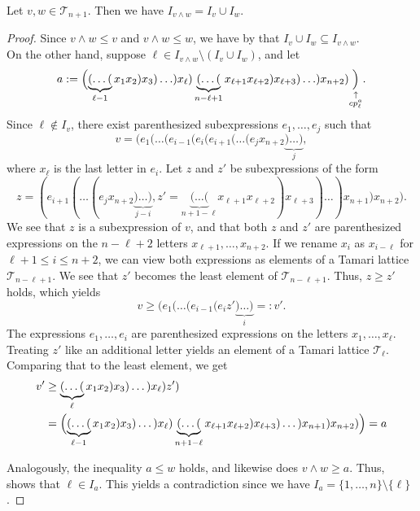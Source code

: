 \documentclass{preprint}
\newcommand{\cT}{\mathcal{T}}
\theoremstyle{definition}
\begin{document}
\begin{lemma}\label{lem: meet height is union}
    Let $v,w \in \cT_{n+1}$. Then we have $I_{v \wedge w} = I_v \cup I_w$.
\end{lemma}
\begin{proof}
    Since $v\wedge w \leq v$ and $v\wedge w \leq w$, we have by  that $I_v \cup I_w \subseteq I_{v\wedge w}$. \\
    On the other hand, suppose $\ell \in I_{v \wedge w}\setminus(I_v \cup I_w)$, and let 
    $$a:= \Bigl(\underbrace{(\dots(}_{\ell-1}x_1x_2)x_3)\ldots)x_\ell)\underbrace{(\dots(}_{n-\ell+1}x_{\ell+1}x_{\ell+2})x_{\ell+3})\ldots)x_{n+2})\underset{\substack{\uparrow \\ cp_\ell^a}}{\Bigr)}.$$
    Since $\ell \notin I_v$, there exist parenthesized subexpressions $e_1,\dots,e_j$ such that
    \[
        v = (e_1(\dots(e_{i-1}(e_i(e_{i+1}(\dots(e_j x_{n+2} \underbrace{)\dots)}_j,
    \]
    where $x_\ell$ is the last letter in $e_i$. Let $z$ and $z'$ be subexpressions of the form
    \[
        z=(e_{i+1}(\dots(e_j x_{n+2} \underbrace{)\dots)}_{j-i}, z'=\underbrace{(\dots(}_{n+1-\ell}x_{\ell+1}x_{\ell+2}) x_{\ell+3}) \dots )x_{n+1})x_{n+2}).
    \] 
    We see that $z$ is a subexpression of $v$, and that both $z$ and $z'$ are parenthesized expressions on the $n-\ell+2$ letters $x_{\ell+1}, \dots, x_{n+2}$. If we rename $x_i$ as $x_{i-\ell}$ for $\ell+1 \leq i \leq n+2$, we can view both expressions as elements of a Tamari lattice $\cT_{n-\ell+1}$. We see that $z'$ becomes the least element of $\cT_{n-\ell+1}$. Thus, $z \geq z'$ holds, which yields
    \[
        v \geq (e_1(\dots(e_{i-1}(e_iz' \underbrace{)\dots)}_i=:v'.
    \]
    The expressions $e_1, \dots, e_i$ are parenthesized expressions on the letters $x_1, \dots, x_\ell$. Treating $z'$ like an additional letter yields an element of a Tamari lattice $\cT_{\ell}$.
    Comparing that to the least element, we get
    \begin{align*}
        v' &\geq \underbrace{(\dots(}_{\ell}x_1x_2)x_3)\dots)x_\ell)z') \\
        &= \Bigl( \underbrace{(\dots(}_{\ell-1}x_1x_2)x_3)\dots)x_\ell) \underbrace{(\dots(}_{n+1-\ell}x_{\ell+1}x_{\ell+2}) x_{\ell+3}) \dots )x_{n+1})x_{n+2}) \Bigr) = a
    \end{align*}
    
    Analogously, the inequality $a \leq w$ holds, and likewise does $v\wedge w \geq a$. Thus,  shows that $\ell \in I_a$. This yields a contradiction since we have $I_a = \{1,\dots,n\}\setminus \{\ell\}$.
\end{proof}
\end{document}
